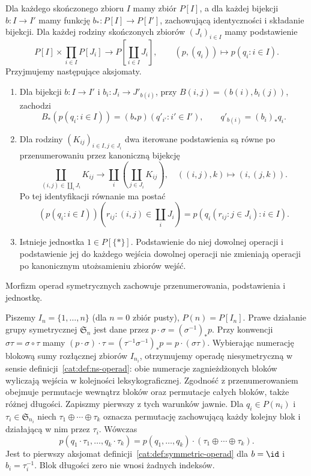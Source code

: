 \begin{definicja}\label{cat:def:symmetric-operad}
Dla każdego skończonego zbioru $I$ mamy zbiór $P[I]$, a dla każdej bijekcji $b:I\to I'$ mamy funkcję $b_*:P[I]\to P[I']$, zachowującą identyczności i składanie bijekcji. Dla każdej rodziny skończonych zbiorów $(J_i)_{i\in I}$ mamy podstawienie
\[
 P[I]\times\prod_{i\in I}P[J_i]\longrightarrow
 P\left[\coprod_{i\in I}J_i\right],\qquad (p,(q_i))\longmapsto p(q_i:i\in I).
\]
Przyjmujemy następujące aksjomaty.
\begin{enumerate}
\item Dla bijekcji $b:I\to I'$ i $b_i:J_i\to J'_{b(i)}$, przy $B(i,j)=(b(i),b_i(j))$, zachodzi
\[
 B_*(p(q_i:i\in I))=(b_*p)(q'_{i'}:i'\in I'),
 \qquad q'_{b(i)}=(b_i)_*q_i.
\]
\item Dla rodziny $(K_{ij})_{i\in I,j\in J_i}$ dwa iterowane podstawienia są równe po przenumerowaniu przez kanoniczną bijekcję
\[
 \coprod_{(i,j)\in\coprod_i J_i} K_{ij}\to
 \coprod_i\left(\coprod_{j\in J_i}K_{ij}\right),
 \quad ((i,j),k)\mapsto(i,(j,k)).
\]
Po tej identyfikacji równanie ma postać
\[
 (p(q_i:i\in I))(r_{ij}:(i,j)\in\coprod_i J_i)
 =p(q_i(r_{ij}:j\in J_i):i\in I).
\]
\item Istnieje jednostka $1\in P[\{*\}]$. Podstawienie do niej dowolnej operacji i podstawienie jej do każdego wejścia dowolnej operacji nie zmieniają operacji po kanonicznym utożsamieniu zbiorów wejść.
\end{enumerate}
Morfizm operad symetrycznych zachowuje przenumerowania, podstawienia i jednostkę.
\end{definicja}
Piszemy $I_n=\{1,\ldots,n\}$ (dla $n=0$ zbiór pusty), $P(n)=P[I_n]$. Prawe działanie grupy symetrycznej $\mathfrak S_n$ jest dane przez $p\cdot\sigma=(\sigma^{-1})_*p$. Przy konwencji $\sigma\tau=\sigma\circ\tau$ mamy $(p\cdot\sigma)\cdot\tau=(\tau^{-1}\sigma^{-1})_*p=p\cdot(\sigma\tau)$. Wybierając numerację blokową sumy rozłącznej zbiorów $I_{n_i}$, otrzymujemy operadę niesymetryczną w sensie definicji~\ref{cat:def:ns-operad}: obie numeracje zagnieżdżonych bloków wyliczają wejścia w kolejności leksykograficznej. Zgodność z przenumerowaniem obejmuje permutacje wewnątrz bloków oraz permutacje całych bloków, także różnej długości. Zapiszmy pierwszy z tych warunków jawnie. Dla $q_i\in P(n_i)$ i $\tau_i\in\mathfrak S_{n_i}$ niech $\tau_1\oplus\cdots\oplus\tau_k$ oznacza permutację zachowującą każdy kolejny blok i działającą w nim przez $\tau_i$. Wówczas
\[
 p(q_1\cdot\tau_1,\ldots,q_k\cdot\tau_k)
 =p(q_1,\ldots,q_k)\cdot(\tau_1\oplus\cdots\oplus\tau_k).
\]
Jest to pierwszy aksjomat definicji~\ref{cat:def:symmetric-operad} dla $b=\id$ i $b_i=\tau_i^{-1}$. Blok długości zero nie wnosi żadnych indeksów.

